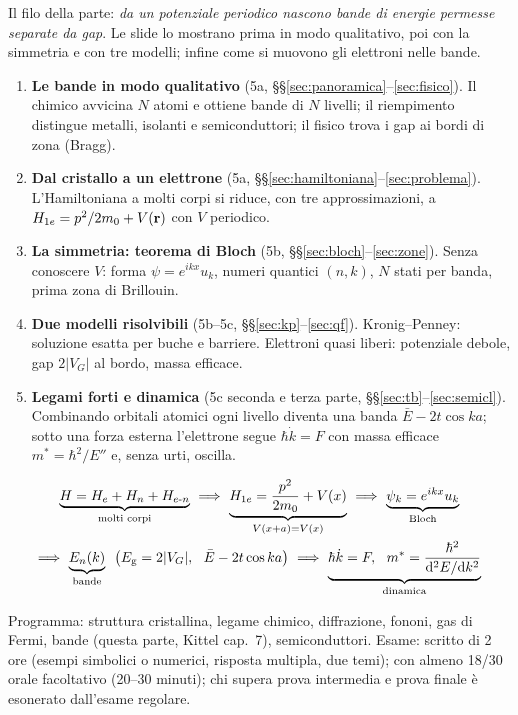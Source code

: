 \documentclass[11pt,a4paper]{article}
\begin{document}
\begin{introduzione}
Il filo della parte: \emph{da un potenziale periodico nascono bande di energie permesse separate da gap}. Le slide lo mostrano prima in modo
qualitativo, poi con la simmetria e con tre modelli; infine come si muovono gli elettroni nelle bande.
\begin{enumerate}[label=\textbf{\Alph*.}, leftmargin=2.2em]
\item \textbf{Le bande in modo qualitativo} (5a, §§\ref{sec:panoramica}--\ref{sec:fisico}). Il chimico avvicina $N$ atomi e ottiene bande di $N$
livelli; il riempimento distingue metalli, isolanti e semiconduttori; il fisico trova i gap ai bordi di zona (Bragg).
\item \textbf{Dal cristallo a un elettrone} (5a, §§\ref{sec:hamiltoniana}--\ref{sec:problema}). L'Hamiltoniana a molti corpi si riduce, con tre
approssimazioni, a $H_{1e}=p^2/2m_0+V(\mathbf r)$ con $V$ periodico.
\item \textbf{La simmetria: teorema di Bloch} (5b, §§\ref{sec:bloch}--\ref{sec:zone}). Senza conoscere $V$: forma $\psi=e^{ikx}u_k$, numeri quantici
$(n,k)$, $N$ stati per banda, prima zona di Brillouin.
\item \textbf{Due modelli risolvibili} (5b--5c, §§\ref{sec:kp}--\ref{sec:qf}). Kronig--Penney: soluzione esatta per buche e barriere. Elettroni
quasi liberi: potenziale debole, gap $2|V_G|$ al bordo, massa efficace.
\item \textbf{Legami forti e dinamica} (5c seconda e terza parte, §§\ref{sec:tb}--\ref{sec:semicl}). Combinando orbitali atomici ogni livello diventa una
banda $\bar E-2t\cos ka$; sotto una forza esterna l'elettrone segue $\hbar\dot k=F$ con massa efficace $m^*=\hbar^2/E''$ e, senza urti, oscilla.
\end{enumerate}
\begin{riepilogo}
\begin{gather*}
\underbrace{H=H_e+H_n+H_{e\text{-}n}}_{\text{molti corpi}}
\ \Longrightarrow\ \underbrace{H_{1e}=\frac{p^2}{2m_0}+V(x)}_{V(x+a)=V(x)}
\ \Longrightarrow\ \underbrace{\psi_k=e^{ikx}u_k}_{\text{Bloch}}\\
\Longrightarrow\ \underbrace{E_n(k)}_{\text{bande}}\ \ \bigl(\Eg=2|V_G|,\ \ \bar E-2t\cos ka\bigr)
\ \Longrightarrow\ \underbrace{\hbar\dot k=F,\ \ m^*=\frac{\hbar^2}{\dd^2E/\dd k^2}}_{\text{dinamica}}
\end{gather*}
\end{riepilogo}
\begin{infobox}[Il corso]
Programma: struttura cristallina, legame chimico, diffrazione, fononi, gas di Fermi, bande (questa parte, Kittel cap.~7), semiconduttori.
Esame: scritto di 2 ore (esempi simbolici o numerici, risposta multipla, due temi); con almeno 18/30 orale facoltativo (20--30 minuti); chi supera
prova intermedia e prova finale è esonerato dall'esame regolare.
\end{infobox}
\end{introduzione}
\end{document}
